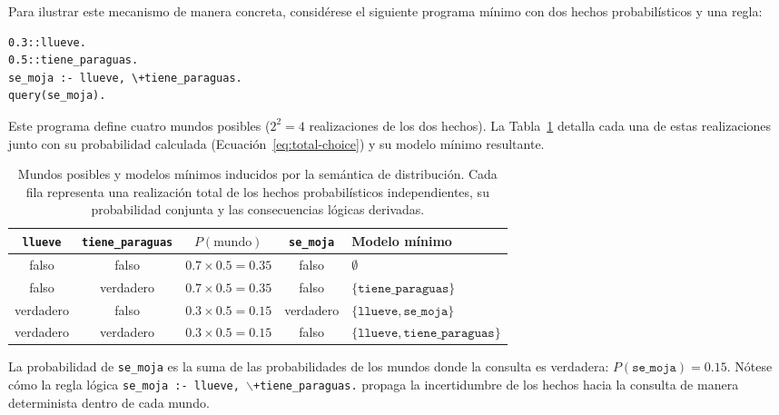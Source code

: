 \clearpage

Para ilustrar este mecanismo de manera concreta, considérese el siguiente programa mínimo con dos hechos probabilísticos y una regla:

\begin{lstlisting}[caption={Programa ProbLog mínimo para ilustrar la semántica de distribución.}]
0.3::llueve.
0.5::tiene_paraguas.
se_moja :- llueve, \+tiene_paraguas.
query(se_moja).
\end{lstlisting}

Este programa define cuatro mundos posibles ($2^2 = 4$ realizaciones de los dos hechos). La Tabla~\ref{tab:mundos_posibles_problog} detalla cada una de estas realizaciones junto con su probabilidad calculada (Ecuación~\ref{eq:total-choice}) y su modelo mínimo resultante.

\begin{table}[H]
    \centering
    \caption{Mundos posibles y modelos mínimos inducidos por la semántica de distribución. Cada fila representa una realización total de los hechos probabilísticos independientes, su probabilidad conjunta y las consecuencias lógicas derivadas.}
    \label{tab:mundos_posibles_problog}
    \small
    \begin{tabular}{ccccl}
        \toprule
        \texttt{llueve} & \texttt{tiene\_paraguas} & $P(\text{mundo})$ & \texttt{se\_moja} & Modelo mínimo \\
        \midrule
        falso & falso & $0.7 \times 0.5 = 0.35$ & falso & $\emptyset$ \\
        falso & verdadero & $0.7 \times 0.5 = 0.35$ & falso & $\{\texttt{tiene\_paraguas}\}$ \\
        verdadero & falso & $0.3 \times 0.5 = 0.15$ & verdadero & $\{\texttt{llueve}, \texttt{se\_moja}\}$ \\
        verdadero & verdadero & $0.3 \times 0.5 = 0.15$ & falso & $\{\texttt{llueve}, \texttt{tiene\_paraguas}\}$ \\
        \bottomrule
    \end{tabular}
\end{table}

La probabilidad de \texttt{se\_moja} es la suma de las probabilidades de los mundos donde la consulta es verdadera: $P(\texttt{se\_moja}) = 0.15$. Nótese cómo la regla lógica \texttt{se\_moja :- llueve, $\backslash$+tiene\_paraguas.} propaga la incertidumbre de los hechos hacia la consulta de manera determinista dentro de cada mundo.

\clearpage

